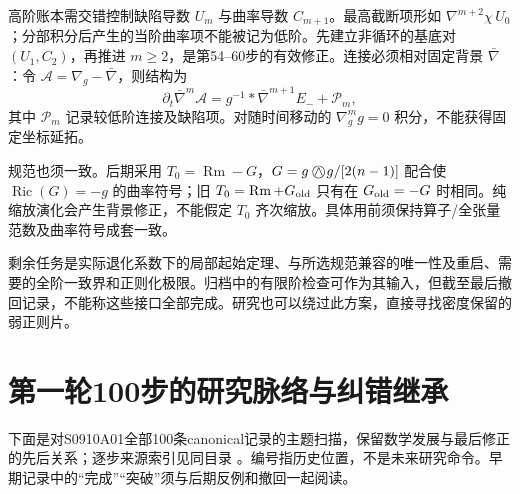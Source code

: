 \documentclass[UTF8,a4paper,11pt,fontset=fandol]{ctexart}
\numberwithin{equation}{section}
\theoremstyle{definition}
\newcommand{\Ric}{\operatorname{Ric}}
\newcommand{\Rm}{\operatorname{Rm}}
\newcommand{\owedge}{\mathbin{\bigcirc\mkern-15mu\wedge}}
\begin{document}
高阶账本需交错控制缺陷导数 $U_m$ 与曲率导数 $C_{m+1}$。最高截断项形如 $\nabla^{m+2}\chi\,U_0$；分部积分后产生的当阶曲率项不能被记为低阶。先建立非循环的基底对 $(U_1,C_2)$，再推进 $m\ge2$，是第54--60步的有效修正。连接必须相对固定背景 $\bar\nabla$：令 $\mathscr A=\nabla_g-\bar\nabla$，则结构为
\[
\partial_t\bar\nabla^m\mathscr A
=g^{-1}*\bar\nabla^{m+1}E_-+\mathcal P_m,
\]
其中 $\mathcal P_m$ 记录较低阶连接及缺陷项。对随时间移动的 $\nabla_g^m g=0$ 积分，不能获得固定坐标延拓。

规范也须一致。后期采用 $T_0=\Rm-G$，$G=g\owedge g/[2(n-1)]$ 配合使 $\Ric(G)=-g$ 的曲率符号；旧 $T_0=\Rm+G_{\rm old}$ 只有在 $G_{\rm old}=-G$ 时相同。纯缩放演化会产生背景修正，不能假定 $T_0$ 齐次缩放。具体用前须保持算子/全张量范数及曲率符号成套一致。

剩余任务是实际退化系数下的局部起始定理、与所选规范兼容的唯一性及重启、需要的全阶一致界和正则化极限。归档中的有限阶检查可作为其输入，但截至最后撤回记录，不能称这些接口全部完成。研究也可以绕过此方案，直接寻找密度保留的弱正则片。

\section{第一轮100步的研究脉络与纠错继承}\label{app:100steps}
下面是对S0910A01全部100条canonical记录的主题扫描，保留数学发展与最后修正的先后关系；逐步来源索引见同目录 。编号指历史位置，不是未来研究命令。早期记录中的“完成”“突破”须与后期反例和撤回一起阅读。
\end{document}
